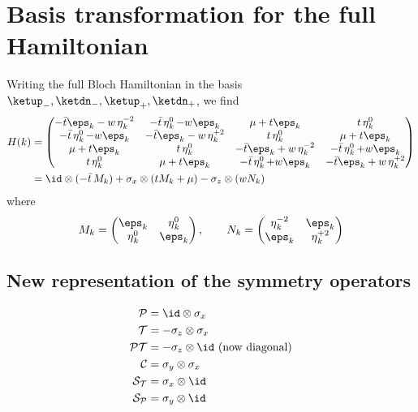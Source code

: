 \section{Basis transformation for the full Hamiltonian}
Writing the full Bloch Hamiltonian in the basis $\ketup_-, \ketdn_-, \ketup_+, \ketdn_+$, we find
\begin{align}
    H(k) &=
    \begin{pmatrix}
        -\tbar\eps_k -w\et_k^{-2} & -\tbar\et_k^0 -w\eps_k & \mu+t\eps_k & t\et_k^0 \\
        -\tbar\et^0_k - w\eps_k & -\tbar \eps_k - w\et_k^{+2} & t\et_k^0 & \mu + t\eps_k \\
        \mu+t\eps_k & t\et_k^0 & -\tbar\eps_k +w\et_k^{-2} & -\tbar\et_k^0 +w\eps_k \\
        t\et_k^0 & \mu + t\eps_k & -\tbar\et^0_k + w\eps_k & -\tbar \eps_k + w\et_k^{+2}
    \end{pmatrix} \\
    &= \id \otimes (-\tbar \, M_k) + \sigma_x \otimes (t M_k + \mu) - \sigma_z \otimes (w N_k)
\end{align}
where
\begin{align}
    M_k = \begin{pmatrix}
        \eps_k & \et_k^0 \\
        \et_k^0 & \eps_k
    \end{pmatrix},\qquad
    N_k = \begin{pmatrix}
    \et_k^{-2} & \eps_k \\
    \eps_k & \et_k^{+2}
    \end{pmatrix}
\end{align}

\subsection{New representation of the symmetry operators}
\begin{align}
    \mathcal{P} &= \id \otimes \sigma_x \\
    \mathcal{T} &= -\sigma_z \otimes \sigma_x \\
    \mathcal{P}\mathcal{T} &= -\sigma_z \otimes \id \text{ (now diagonal)} \\
    \mathcal{C} &= \sigma_y \otimes \sigma_x \\
    \mathcal{S}_\mathcal{T} &= \sigma_x \otimes \id \\
    \mathcal{S}_\mathcal{P} &= \sigma_y \otimes \id
\end{align}

